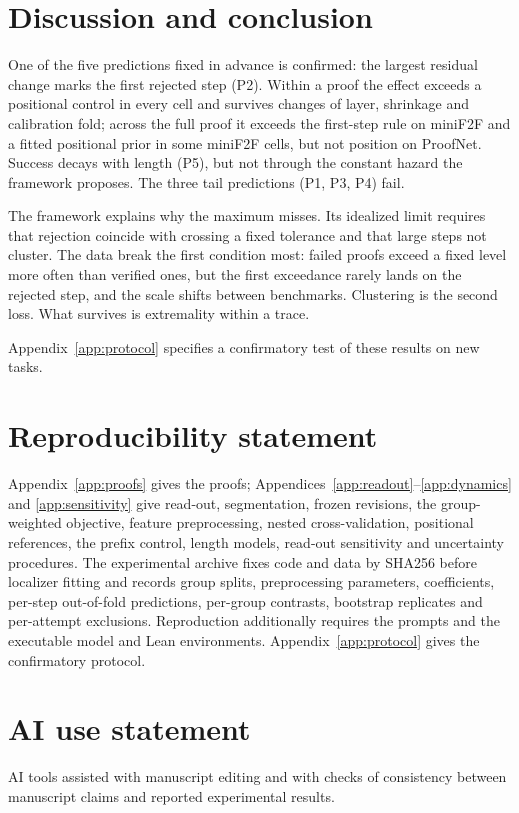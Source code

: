 \section{Discussion and conclusion}\label{sec:discussion}

One of the five predictions fixed in advance is confirmed: the largest residual change marks the first rejected step (P2). Within a proof the effect exceeds a positional control in every cell and survives changes of layer, shrinkage and calibration fold; across the full proof it exceeds the first-step rule on miniF2F and a fitted positional prior in some miniF2F cells, but not position on ProofNet. Success decays with length (P5), but not through the constant hazard the framework proposes. The three tail predictions (P1, P3, P4) fail.

The framework explains why the maximum misses. Its idealized limit requires that rejection coincide with crossing a fixed tolerance and that large steps not cluster. The data break the first condition most: failed proofs exceed a fixed level more often than verified ones, but the first exceedance rarely lands on the rejected step, and the scale shifts between benchmarks. Clustering is the second loss. What survives is extremality within a trace.

Appendix~\ref{app:protocol} specifies a confirmatory test of these results on new tasks.

\section*{Reproducibility statement}
Appendix~\ref{app:proofs} gives the proofs; Appendices~\ref{app:readout}--\ref{app:dynamics} and \ref{app:sensitivity} give read-out, segmentation, frozen revisions, the group-weighted objective, feature preprocessing, nested cross-validation, positional references, the prefix control, length models, read-out sensitivity and uncertainty procedures. The experimental archive fixes code and data by SHA256 before localizer fitting and records group splits, preprocessing parameters, coefficients, per-step out-of-fold predictions, per-group contrasts, bootstrap replicates and per-attempt exclusions. Reproduction additionally requires the prompts and the executable model and Lean environments. Appendix~\ref{app:protocol} gives the confirmatory protocol.

\section*{AI use statement}
AI tools assisted with manuscript editing and with checks of consistency between manuscript claims and reported experimental results.
